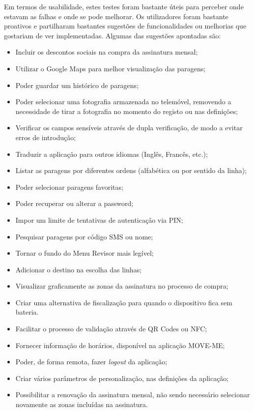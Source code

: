 Em termos de usabilidade, estes testes foram bastante úteis para perceber onde estavam as falhas e onde se pode melhorar. Os utilizadores foram bastante proativos e partilharam bastantes sugestões de funcionalidades ou melhorias que gostariam de ver implementadas. Algumas das sugestões apontadas são:
\begin{itemize}
\item Incluir os descontos sociais na compra da assinatura mensal;
\item Utilizar o Google Maps para melhor visualização das paragens;
\item Poder guardar um histórico de paragens;
\item Poder selecionar uma fotografia armazenada no telemóvel, removendo a necessidade de tirar a fotografia no momento do registo ou nas definições;
\item Verificar os campos sensíveis através de dupla verificação, de modo a evitar erros de introdução;
\item Traduzir a aplicação para outros idiomas (Inglês, Francês, etc.);
\item Listar as paragens por diferentes ordens (alfabética ou por sentido da linha);
\item Poder selecionar paragens favoritas;
\item Poder recuperar ou alterar a password;
\item Impor um limite de tentativas de autenticação via PIN;
\item Pesquisar paragens por código SMS ou nome;
\item Tornar o fundo do Menu Revisor mais legível;
\item Adicionar o destino na escolha das linhas;
\item Visualizar graficamente as zonas da assinatura no processo de compra;
\item Criar uma alternativa de fiscalização para quando o dispositivo fica sem bateria.
\item Facilitar o processo de validação através de QR Codes ou NFC;
\item Fornecer informação de horários, disponível na aplicação MOVE-ME;
\item Poder, de forma remota, fazer \emph{logout} da aplicação;
\item Criar vários parâmetros de personalização, nas definições da aplicação;
\item Possibilitar a renovação da assinatura mensal, não sendo necessário selecionar novamente as zonas incluídas na assinatura.
\end{itemize}